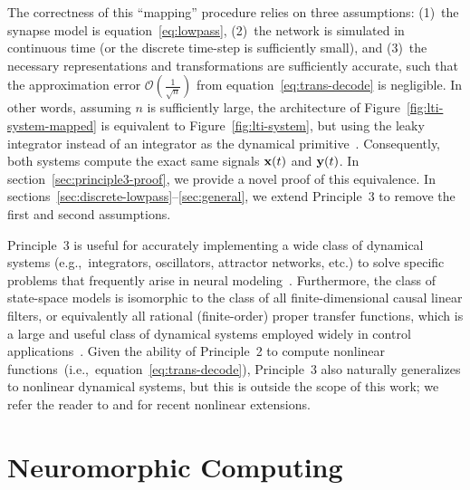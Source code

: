 The correctness of this ``mapping'' procedure relies on three assumptions: (1)~the synapse model is equation~\ref{eq:lowpass}, (2)~the network is simulated in continuous time (or the discrete time-step is sufficiently small), and (3)~the necessary representations and transformations are sufficiently accurate, such that the approximation error $\mathcal{O} \left( \frac{1}{\sqrt{n}} \right)$ from equation~\ref{eq:trans-decode} is negligible.
In other words, assuming $n$ is sufficiently large, the architecture of Figure~\ref{fig:lti-system-mapped} is equivalent to Figure~\ref{fig:lti-system}, but using the leaky integrator instead of an integrator as the dynamical primitive~\citep{eliasmith2003neural}.
Consequently, both systems compute the exact same signals $\mathbf{x}(t)$ and $\mathbf{y}(t)$.
In section~\ref{sec:principle3-proof}, we provide a novel proof of this equivalence.
In sections~\ref{sec:discrete-lowpass}--\ref{sec:general}, we extend Principle~3 to remove the first and second assumptions.

Principle~3 is useful for accurately implementing a wide class of dynamical systems (e.g.,~integrators, oscillators, attractor networks, etc.) to solve specific problems that frequently arise in neural modeling~\citep[e.g.,][]{eliasmith2000b, singh2004, eliasmith2005b, singh2006}.
Furthermore, the class of state-space models is isomorphic to the class of all finite-dimensional causal linear filters, or equivalently all rational (finite-order) proper transfer functions, which is a large and useful class of dynamical systems employed widely in control applications~\citep{brogan1982modern}.
Given the ability of Principle~2 to compute nonlinear functions~(i.e.,~equation~\ref{eq:trans-decode}), Principle~3 also naturally generalizes to nonlinear dynamical systems, but this is outside the scope of this work; we refer the reader to \citet{voelker2017iscas} and \citet{voelker2017neuromorphic} for recent nonlinear extensions.


\section{Neuromorphic Computing}

